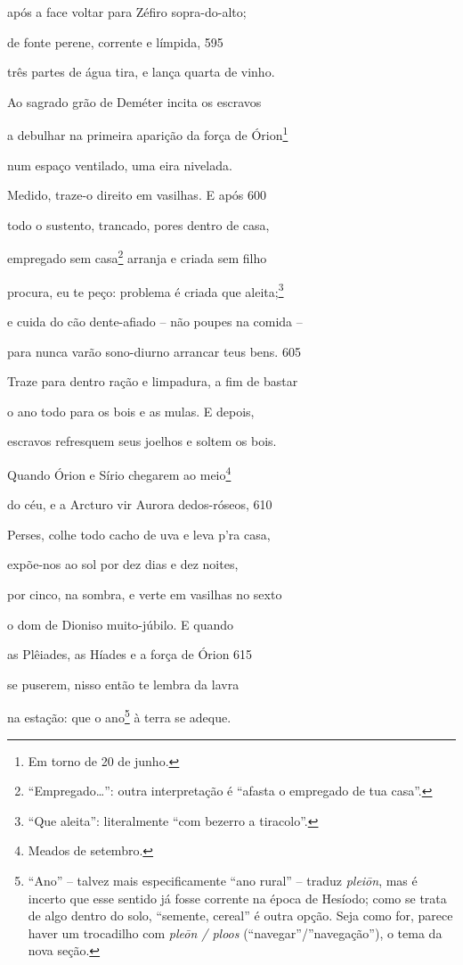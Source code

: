 após a face voltar para Zéfiro sopra-do-alto;

de fonte perene, corrente e límpida, \num{595}

três partes de água tira, e lança quarta de vinho.

Ao sagrado grão de Deméter incita os escravos

a debulhar na primeira aparição da força de Órion\footnote{Em torno de 20 de junho.}

num espaço ventilado, uma eira nivelada.

Medido, traze-o direito em vasilhas. E após \num{600}

todo o sustento, trancado, pores dentro de casa,

empregado sem casa\footnote{``Empregado\ldots{}'': outra interpretação é ``afasta o empregado de tua casa''.} arranja e criada sem filho

procura, eu te peço: problema é criada que aleita;\footnote{``Que aleita'': literalmente ``com bezerro a tiracolo''.}

e cuida do cão dente-afiado -- não poupes na comida --

para nunca varão sono-diurno arrancar teus bens. \num{605}

Traze para dentro ração e limpadura, a fim de bastar

o ano todo para os bois e as mulas. E depois,

escravos refresquem seus joelhos e soltem os bois.

Quando Órion e Sírio chegarem ao meio\footnote{Meados de setembro.}

do céu, e a Arcturo vir Aurora dedos-róseos, \num{610}

Perses, colhe todo cacho de uva e leva p'ra casa,

expõe-nos ao sol por dez dias e dez noites,

por cinco, na sombra, e verte em vasilhas no sexto

o dom de Dioniso muito-júbilo. E quando

as Plêiades, as Híades e a força de Órion \num{615}

se puserem, nisso então te lembra da lavra

na estação: que o ano\footnote{``Ano'' -- talvez mais especificamente ``ano rural'' -- traduz
\emph{pleiōn}, mas é incerto que esse sentido já fosse corrente na época
de Hesíodo; como se trata de algo dentro do solo, ``semente, cereal'' é
outra opção. Seja como for, parece haver um trocadilho com \emph{pleōn /
ploos} (``navegar''/''navegação''), o tema da nova seção.} à terra se adeque.

